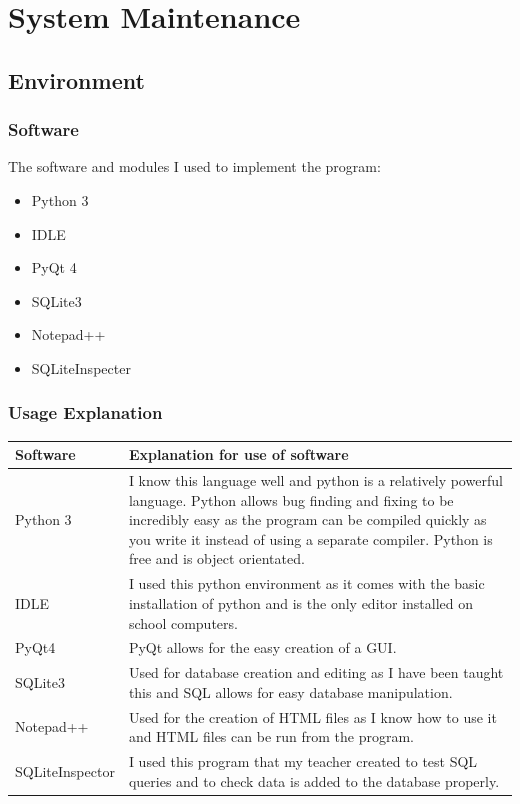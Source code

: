 \chapter{System Maintenance}

\section{Environment}

\subsection{Software}
The software and modules I used to implement the program:
\begin{itemize}
	\item Python 3
	\item IDLE
	\item PyQt 4
	\item SQLite3
	\item Notepad++
	\item SQLiteInspecter
\end{itemize}

\subsection{Usage Explanation}
\begin{center}
	\begin{tabular}{|p{3cm}|p{6cm}|}
		\hline
		\textbf{Software}   & \textbf{Explanation for use of software} \\ \hline
		Python 3 & I know this language well and python is a relatively powerful language. Python allows bug finding and fixing to be incredibly easy as the program can be compiled quickly as you write it instead of using a separate compiler. Python is free and is object orientated. \\ \hline
		IDLE &  I used this python environment as it comes with the basic installation of python and is the only editor installed on school computers. \\ \hline
		PyQt4 & PyQt allows for the easy creation of a GUI. \\ \hline
		SQLite3 & Used for database creation and editing as I have been taught this and SQL allows for easy database manipulation. \\ \hline
		Notepad++ & Used for the creation of HTML files as I know how to use it and HTML files can be run from the program. \\ \hline
		SQLiteInspector & I used this program that my teacher created to test SQL queries and to check data is added to the database properly. \\ \hline
	\end{tabular}
\end{center}


